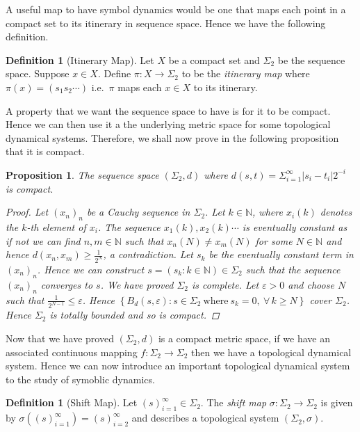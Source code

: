 \documentclass[11pt,a4paper,oneside]{memoir}
\theoremstyle{plain}
\newtheorem{prop}[thm]{Proposition}
\theoremstyle{definition}
\newtheorem{defn}[thm]{Definition}
\begin{document}
A useful map to have symbol dynamics would be one that maps each point in a compact set to its itinerary in sequence space. Hence we have the following definition.

\begin{defn}[Itinerary Map] \label{defn:itinerary-map}
    Let $X$ be a compact set and $\Sigma_2$ be the sequence space. Suppose $x \in X$. Define $\pi : X \to \Sigma_2$ to be the \emph{itinerary map} where $\pi(x) = (s_1s_2\cdots)$ i.e.\ $\pi$ maps each $x \in X$ to its itinerary.
\end{defn}

A property that we want the sequence space to have is for it to be compact. Hence we can then use it a the underlying metric space for some topological dynamical systems. Therefore, we shall now prove in the following proposition that it is compact.

\begin{prop}
    The sequence space $(\Sigma_2, d)$ where $d(s, t) = \Sigma_{i=1}^{\infty}|s_i - t_i|2^{-i}$ is compact.
    \begin{proof}
        Let $(x_n)_n$ be a Cauchy sequence in $\Sigma_2$. Let $k \in \mathbb{N}$, where $x_i(k)$ denotes the $k$-th element of $x_i$. The sequence $x_1(k),x_2(k)\cdots$ is eventually constant as if not we can find $n, m \in \mathbb{N}$ such that $x_n(N) \neq x_m(N)$ for some $N \in \mathbb{N}$ and hence $d(x_n, x_m) \geq \frac{1}{2^N}$, a contradiction. Let $s_k$ be the eventually constant term in $(x_n)_n$. Hence we can construct $s = ( s_k : k \in \mathbb{N} ) \in \Sigma_2$ such that the sequence $(x_n)_n$ converges to $s$. We have proved $\Sigma_2$ is complete. Let $\varepsilon > 0$ and choose $N$ such that $\frac{1}{2^{N - 1}} \leq \varepsilon$. Hence $\left\lbrace B_d(s, \varepsilon) : s \in \Sigma_2 \ \text{where} \ s_k = 0, \ \forall\, k \geq N\right\rbrace$ cover $\Sigma_2$. Hence $\Sigma_2$ is totally bounded and so is compact.
    \end{proof}
\end{prop}

Now that we have proved $(\Sigma_2, d)$ is a compact metric space, if we have an associated continuous mapping $f: \Sigma_2 \to \Sigma_2$ then we have a topological dynamical system. Hence we can now introduce an important topological dynamical system to the study of symoblic dynamics.

\begin{defn} [Shift Map]
    Let $(s)_{i=1}^{\infty} \in \Sigma_2$. The \emph{shift map} $\sigma: \Sigma_2 \to \Sigma_2$ is given by $\sigma \left((s)_{i=1}^{\infty}\right) = (s)_{i=2}^{\infty}$ and describes a topological system $(\Sigma_2, \sigma)$.
\end{defn}
\end{document}
